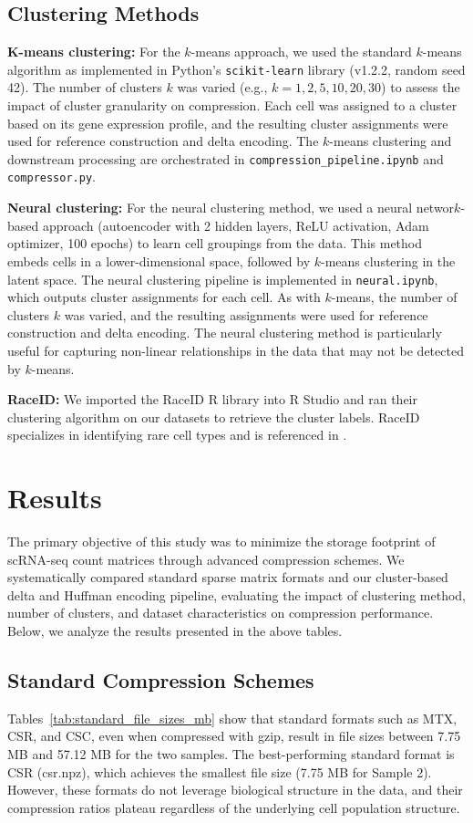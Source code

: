 \documentclass[unnumsec,webpdf,contemporary,large]{oup-authoring-template}
\begin{document}
\subsection{Clustering Methods}
\textbf{K-means clustering:} For the $k$-means approach, we used the standard $k$-means algorithm as implemented in Python's \texttt{scikit-learn} library (v1.2.2, random seed 42). The number of clusters $k$ was varied (e.g., $k=1,2,5,10,20,30$) to assess the impact of cluster granularity on compression. Each cell was assigned to a cluster based on its gene expression profile, and the resulting cluster assignments were used for reference construction and delta encoding. The $k$-means clustering and downstream processing are orchestrated in \texttt{compression\_pipeline.ipynb} and \texttt{compressor.py}.

\textbf{Neural clustering:} For the neural clustering method, we used a neural networ$k$-based approach (autoencoder with 2 hidden layers, ReLU activation, Adam optimizer, 100 epochs) to learn cell groupings from the data. This method embeds cells in a lower-dimensional space, followed by $k$-means clustering in the latent space. The neural clustering pipeline is implemented in \texttt{neural.ipynb}, which outputs cluster assignments for each cell. As with $k$-means, the number of clusters $k$ was varied, and the resulting assignments were used for reference construction and delta encoding. The neural clustering method is particularly useful for capturing non-linear relationships in the data that may not be detected by $k$-means.

\textbf{RaceID:} We imported the RaceID R library into R Studio and ran their clustering algorithm on our datasets to retrieve the cluster labels. RaceID specializes in identifying rare cell types and is referenced in \cite{raceID}.

\section{Results}

The primary objective of this study was to minimize the storage footprint of scRNA-seq count matrices through advanced compression schemes. We systematically compared standard sparse matrix formats and our cluster-based delta and Huffman encoding pipeline, evaluating the impact of clustering method, number of clusters, and dataset characteristics on compression performance. Below, we analyze the results presented in the above tables.

\subsection{Standard Compression Schemes}
Tables~\ref{tab:standard_file_sizes_mb} show that standard formats such as MTX, CSR, and CSC, even when compressed with gzip, result in file sizes between 7.75 MB and 57.12 MB for the two samples. The best-performing standard format is CSR (csr.npz), which achieves the smallest file size (7.75 MB for Sample 2). However, these formats do not leverage biological structure in the data, and their compression ratios plateau regardless of the underlying cell population structure.
\end{document}
